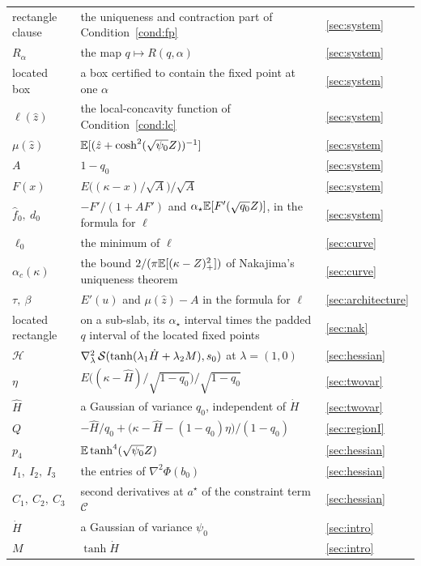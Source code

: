 \begin{longtable}{p{}p{}p{}}
rectangle clause & the uniqueness and contraction part of Condition~\ref{cond:fp} & \ref{sec:system}\\
$R_\alpha$ & the map $q\mapsto R(q,\alpha)$ & \ref{sec:system}\\
located box & a box certified to contain the fixed point at one $\alpha$ & \ref{sec:system}\\
$\ell(\hat z)$ & the local-concavity function of Condition~\ref{cond:lc} & \ref{sec:system}\\
$\mu(\hat z)$ & $\mathbb{E}[(\hat z+\cosh^2(\sqrt{\psi_0}Z))^{-1}]$ & \ref{sec:system}\\
$A$ & $1-q_0$ & \ref{sec:system}\\
$F(x)$ & $E\bigl((\kappa-x)/\sqrt A\bigr)/\sqrt A$ & \ref{sec:system}\\
$\hat f_0,\ d_0$ & $-F'/(1+AF')$ and $\alpha_\star\mathbb{E}[F'(\sqrt{q_0}Z)]$, in the formula for $\ell$ & \ref{sec:system}\\
$\ell_0$ & the minimum of $\ell$ & \ref{sec:curve}\\
$\alpha_c(\kappa)$ & the bound $2/(\pi\mathbb{E}[(\kappa-Z)_+^2])$ of Nakajima's uniqueness theorem & \ref{sec:curve}\\
$\tau,\ \beta$ & $E'(u)$ and $\mu(\hat z)-A$ in the formula for $\ell$ & \ref{sec:architecture}\\
located rectangle & on a sub-slab, its $\alpha_\star$ interval times the padded $q$ interval of the located fixed points & \ref{sec:nak}\\
$\mathcal H$ & $\nabla^2_\lambda\,\mathcal{S}(\tanh(\lambda_1\dot H+\lambda_2M),s_0)$ at $\lambda=(1,0)$ & \ref{sec:hessian}\\
$\eta$ & $E\bigl((\kappa-\hat H)/\sqrt{1-q_0}\bigr)/\sqrt{1-q_0}$ & \ref{sec:twovar}\\
$\hat H$ & a Gaussian of variance $q_0$, independent of $\dot H$ & \ref{sec:twovar}\\
$Q$ & $-\hat H/q_0+\bigl(\kappa-\hat H-(1-q_0)\eta\bigr)/(1-q_0)$ & \ref{sec:regionI}\\
$p_4$ & $\mathbb{E}\tanh^4(\sqrt{\psi_0}Z)$ & \ref{sec:hessian}\\
$I_1,\ I_2,\ I_3$ & the entries of $\nabla^2\Phi(b_0)$ & \ref{sec:hessian}\\
$C_1,\ C_2,\ C_3$ & second derivatives at $a^\star$ of the constraint term $\mathcal C$ & \ref{sec:hessian}\\
$\dot H$ & a Gaussian of variance $\psi_0$ & \ref{sec:intro}\\
$M$ & $\tanh\dot H$ & \ref{sec:intro}\\

\end{longtable}
